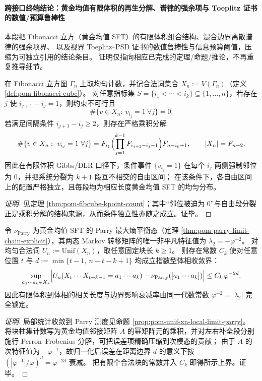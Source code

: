 
\paragraph{跨接口终端结论：黄金均值有限体积的再生分解、谱律的强余项与 Toeplitz 证书的数值/预算鲁棒性}
本段把 Fibonacci 立方（黄金均值 SFT）的有限体积组合结构、混合边界离散谱律的强余项界、
以及视界 Toeplitz--PSD 证书的数值鲁棒性与信息预算阈值，压缩为可独立引用的结论条目。
证明仅指向相应已完成的定理/命题/推论，不再重复推导细节。

\begin{conclusion}\label{con:xi-terminal-golden-mean-dlr-regeneration-factorization}
在 Fibonacci 立方图 \(\Gamma_n\) 上取均匀计数，并记合法词集合 \(X_n:=V(\Gamma_n)\)（定义 \ref{def:pom-fibonacci-cube}）。
对任意指标集 \(S=\{i_1<\cdots<i_k\}\subseteq\{1,\dots,n\}\)，若存在 \(j\) 使 \(i_{j+1}-i_j=1\)，则约束不可行且
\[
\#\{v\in X_n:\ v_{i_j}=1\ \forall j\}=0.
\]
若满足间隔条件 \(i_{j+1}-i_j\ge 2\)，则存在严格乘积分解
\[
\#\{v\in X_n:\ v_{i_j}=1\ \forall j\}
=F_{i_1}\Bigl(\prod_{j=1}^{k-1}F_{i_{j+1}-i_j-1}\Bigr)F_{n-i_k+1},
\qquad |X_n|=F_{n+2}.
\]
因此在有限体积 Gibbs/DLR 口径下，条件事件 \(\{v_{i_j}=1\}\) 在每个 \(i_j\) 两侧强制邻位为 \(0\)，并把系统分裂为 \(k+1\) 段互不相交的自由区间；
在该条件下，各自由区间上的配置严格独立，且每段均为相应长度黄金均值 SFT 的均匀分布。
\end{conclusion}
\begin{proof}[证明]
见定理 \ref{thm:pom-fibcube-kpoint-count}；其中“邻位被迫为 \(0\)”与自由段分裂正是乘积分解的结构来源，从而条件独立性亦随之成立。证毕。
\end{proof}

\begin{conclusion}[有限体积 \texorpdfstring{$\Rightarrow$}{=>} Parry 体相的指数速率：误差由次特征值 \texorpdfstring{$-\varphi^{-2}$}{-phi^{-2}} 单独锁定]\label{con:xi-terminal-unif-xn-to-parry-exp-rate}
令 \(\nu_{\mathrm{Parry}}\) 为黄金均值 SFT 的 Parry 最大熵平衡态（定理 \ref{thm:pom-parry-limit-chain-explicit}），其两态 Markov 转移矩阵的唯一非平凡特征值为 \(\lambda_2=-\varphi^{-2}\)。
对均匀合法词 \(U_n:=\mathrm{Unif}(X_n)\)，取任意固定块长 \(k\ge 1\)。
则存在常数 \(C_k\) 使对任意位置 \(t\) 与
\(
d:=\min\{t-1,\ n-t-k+1\}
\)
均成立指数型体相收敛界：
\[
\sup_{a_1\cdots a_k\in X_k}\Bigl|
U_n(X_t\cdots X_{t+k-1}=a_1\cdots a_k)-\nu_{\mathrm{Parry}}([a_1\cdots a_k])
\Bigr|
\le C_k\,\varphi^{-2d}.
\]
因此有限体积到体相的相关长度与边界影响衰减率由同一代数常数 \(\varphi^{-2}=|\lambda_2|\) 完全锁定。
\end{conclusion}
\begin{proof}[证明]
局部统计收敛到 Parry 测度见命题 \ref{prop:pom-unif-xn-local-limit-parry}。
将块柱集计数写为黄金均值邻接矩阵 \(A\) 的幂矩阵元的乘积，并对左右补全段分别施行 Perron--Frobenius 分解，可把误差项精确压缩到次模态的贡献；
由于 \(A\) 的次特征值为 \(-\varphi^{-1}\)，故归一化后误差在距离边界 \(d\) 的意义下按 \((|\varphi^{-1}|/\varphi)^d=\varphi^{-2d}\) 衰减。
把有限个合法块的常数并入 \(C_k\) 即得所示上界。证毕。
\end{proof}

